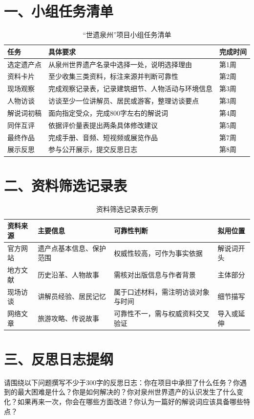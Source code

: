 
\section*{一、小组任务清单}

\begin{table}[htbp]
  \centering
  \caption{“世遗泉州”项目小组任务清单}
  \label{tab:tasklist}
  \begin{tabularx}{\textwidth}{@{}L{2.6cm}Yp{2.2cm}@{}}
    \toprule
    任务 & 具体要求 & 完成时间 \\
    \midrule
    选定遗产点 & 从泉州世界遗产名录中选择一处，说明选择理由 & 第1周 \\
    资料卡片 & 至少收集三类资料，标注来源并判断可靠性 & 第2周 \\
    现场观察 & 完成观察记录表，记录建筑细节、人物活动与环境信息 & 第3周 \\
    人物访谈 & 访谈至少一位讲解员、居民或游客，整理访谈要点 & 第3周 \\
    解说词初稿 & 面向指定受众，完成800字左右的解说词 & 第4周 \\
    同伴互评 & 依据评价量表提出两条具体修改建议 & 第5周 \\
    最终作品 & 完成手册、音频、短视频或展览作品 & 第7周 \\
    展示反思 & 参与公开展示，提交反思日志 & 第8周 \\
    \bottomrule
  \end{tabularx}
\end{table}

\section*{二、资料筛选记录表}

\begin{table}[htbp]
  \centering
  \caption{资料筛选记录表示例}
  \label{tab:source}
  \begin{tabularx}{\textwidth}{@{}L{2.2cm}L{3.2cm}Yp{2.2cm}@{}}
    \toprule
    资料来源 & 主要信息 & 可靠性判断 & 拟用位置 \\
    \midrule
    官方网站 & 遗产点基本信息、保护范围 & 权威性较高，可作为事实依据 & 解说词开头 \\
    地方文献 & 历史沿革、人物故事 & 需核对出版信息与作者背景 & 主体部分 \\
    现场访谈 & 讲解员经验、居民记忆 & 属于口述材料，需注明访谈对象与时间 & 细节描写 \\
    网络文章 & 旅游攻略、传说故事 & 可靠性不一，需与权威资料交叉验证 & 导入或延伸 \\
    \bottomrule
  \end{tabularx}
\end{table}

\section*{三、反思日志提纲}

请围绕以下问题撰写不少于300字的反思日志：你在项目中承担了什么任务？你遇到的最大困难是什么？你是如何解决的？你对泉州世界遗产的认识发生了什么变化？如果再来一次，你会在哪些方面改进？你认为一篇好的解说词应该具备哪些特点？
